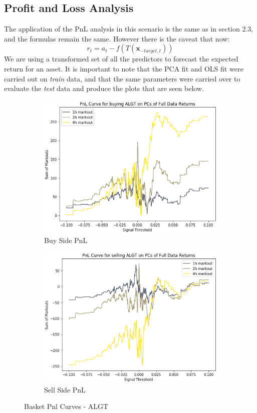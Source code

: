 \documentclass{article}
\begin{document}
\subsection{Profit and Loss Analysis}
The application of the PnL analysis in this scenario is the same as in section
2.3, and the formulas remain the same. However there is the caveat that now:
$$r_t = a_t - f(T(\mathbf{x}_{-target,t}))$$
We are using a transformed set of all the predictors to forecast the expected return
for an asset. It is important to note that the PCA fit and OLS fit were 
carried out on \textit{train} data, and that the same parameters were carried over 
to evaluate the \textit{test} data and produce the plots that are seen below.
\begin{figure}[h!]
  \centering
  \begin{subfigure}{.5\textwidth}
    \centering
    \includegraphics[width=.95\linewidth]{../Figures/basket_Pnl_Curve_buy_ALGT.png}
    \caption{Buy Side PnL}
  \end{subfigure}%
  \begin{subfigure}{.5\textwidth}
    \centering
    \includegraphics[width=.95\linewidth]{../Figures/basket_Pnl_Curve_sell_ALGT.png}
    \caption{Sell Side PnL}
  \end{subfigure}
  \caption{Basket Pnl Curves - ALGT}
\end{figure}
\end{document}
